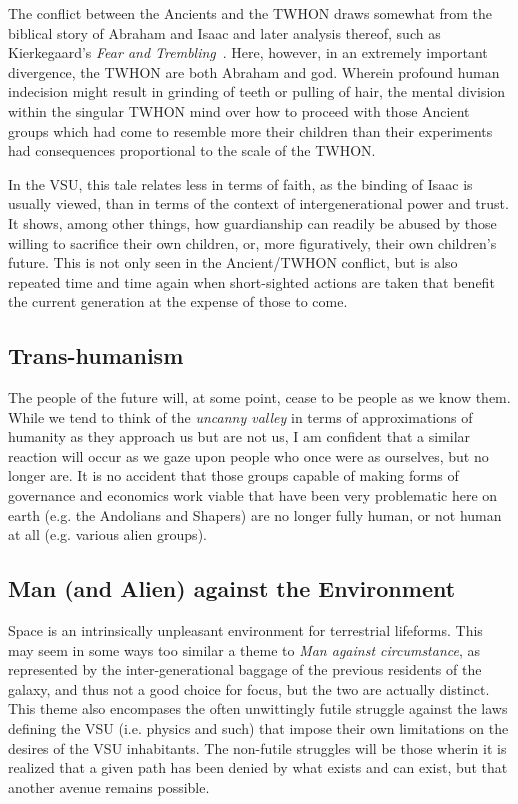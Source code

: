 The conflict between the Ancients and the TWHON draws somewhat from
the biblical story of Abraham and Isaac and later analysis thereof,
such as Kierkegaard's \emph{Fear and
Trembling}~\cite{KierkegaardFearandTrembling}. Here, however, in an
extremely important divergence, the TWHON are both Abraham and
god. Wherein profound human indecision might result in grinding of
teeth or pulling of hair, the mental division within the singular
TWHON mind over how to proceed with those Ancient groups which had
come to resemble more their children than their experiments had
consequences proportional to the scale of the TWHON.

In the VSU, this tale relates less in terms of faith, as the binding
of Isaac is usually viewed, than in terms of the context of
intergenerational power and trust. It shows, among other things, how
guardianship can readily be abused by those willing to sacrifice their
own children, or, more figuratively, their own children's future. This
is not only seen in the Ancient/TWHON conflict, but is also repeated
time and time again when short-sighted actions are taken that benefit
the current generation at the expense of those to come.

\subsection{Trans-humanism}

The people of the future will, at some point, cease to be people as we
know them. While we tend to think of the {\em uncanny valley} in terms
of approximations of humanity as they approach us but are not us, I am
confident that a similar reaction will occur as we gaze upon people
who once were as ourselves, but no longer are. It is no accident that
those groups capable of making forms of governance and economics work
viable that have been very problematic here on earth (e.g. the
Andolians and Shapers) are no longer fully human, or not human at all
(e.g. various alien groups).

\subsection{Man (and Alien) against the Environment}

Space is an intrinsically unpleasant environment for terrestrial
lifeforms. This may seem in some ways too similar a theme to {\em Man
against circumstance}, as represented by the inter-generational
baggage of the previous residents of the galaxy, and thus not a good
choice for focus, but the two are actually distinct. This theme also
encompases the often unwittingly futile struggle against the laws
defining the VSU (i.e. physics and such) that impose their own
limitations on the desires of the VSU inhabitants. The non-futile
struggles will be those wherin it is realized that a given path has
been denied by what exists and can exist, but that another avenue
remains possible.

